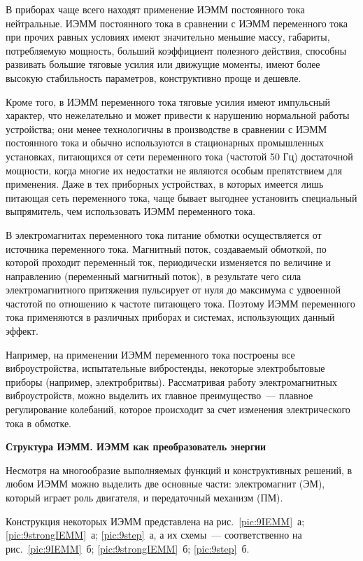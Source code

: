 В приборах чаще всего находят применение ИЭММ постоянного тока нейтральные. ИЭММ постоянного тока в сравнении с ИЭММ переменного тока при прочих равных условиях имеют значительно меньшие массу, габариты, потребляемую мощность, больший коэффициент полезного действия, способны развивать большие тяговые усилия или движущие моменты, имеют более высокую стабильность параметров, конструктивно проще и дешевле.

Кроме того, в ИЭММ переменного тока тяговые усилия имеют импульсный характер, что нежелательно и может привести к нарушению нормальной работы устройства; они менее технологичны в производстве в сравнении с ИЭММ постоянного тока и обычно используются в стационарных промышленных установках, питающихся от сети переменного тока (частотой 50 Гц) достаточной мощности, когда многие их недостатки не являются особым препятствием для применения. Даже в тех приборных устройствах, в которых имеется лишь питающая сеть переменного тока, чаще бывает выгоднее установить специальный выпрямитель, чем использовать ИЭММ переменного тока.

В электромагнитах переменного тока питание обмотки осуществляется от источника переменного тока. Магнитный поток, создаваемый обмоткой, по которой проходит переменный ток, периодически изменяется по величине и направлению (переменный магнитный поток), в результате чего сила электромагнитного притяжения пульсирует от нуля до максимума с удвоенной частотой по отношению к частоте питающего тока. Поэтому ИЭММ переменного тока применяются в различных приборах и системах, использующих данный эффект. 

Например, на применении ИЭММ переменного тока построены все виброустройства, испытательные вибростенды, некоторые электробытовые приборы (например, электробритвы). Рассматривая работу электромагнитных виброустройств, можно выделить их главное преимущество~--- плавное регулирование колебаний, которое происходит за счет изменения электрического тока в обмотке.

\begin{flushleft}
\textbf{Структура ИЭММ. ИЭММ как преобразователь энергии }
\end{flushleft}

Несмотря на многообразие выполняемых функций и конструктивных решений, в любом ИЭММ можно выделить две основные части: электромагнит (ЭМ), который играет роль двигателя, и передаточный механизм (ПМ). 

Конструкция некоторых ИЭММ представлена на рис.~\ref{pic:9IEMM}~а; \ref{pic:9strongIEMM}~а; \ref{pic:9step}~а, а их схемы~--- соответственно на рис.~\ref{pic:9IEMM}~б; \ref{pic:9strongIEMM}~б; \ref{pic:9step}~б.

